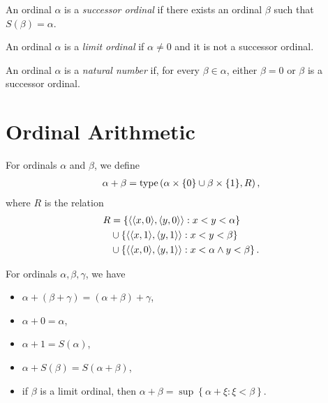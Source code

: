 \begin{defn}
    An ordinal $\alpha$ is a \emph{successor ordinal} if there exists an ordinal $\beta$ such that $S(\beta) = \alpha$.

    An ordinal $\alpha$ is a \emph{limit ordinal} if $\alpha \neq 0$ and it is not a successor ordinal.

    An ordinal $\alpha$ is a \emph{natural number} if, for every $\beta \in \alpha$, either $\beta = 0$ or $\beta$ is a successor ordinal.
\end{defn}

\section{Ordinal Arithmetic}

\begin{defn}
    For ordinals $\alpha$ and $\beta$, we define
    \begin{align*}
        \alpha + \beta = \operatorname{type}\left(\alpha \times \{0\} \cup \beta \times \{1\}, R\right),
    \end{align*}
    where $R$ is the relation
    \begin{align*}
        R &= \left\{\langle \langle x, 0 \rangle, \langle y, 0 \rangle \rangle : x < y < \alpha\right\} \\
        &\cup \left\{\langle \langle x, 1 \rangle, \langle y, 1 \rangle \rangle : x < y < \beta\right\} \\
        &\cup \left\{\langle \langle x, 0 \rangle, \langle y, 1 \rangle \rangle : x < \alpha \land y < \beta\right\}.
    \end{align*}
\end{defn}

\begin{thm}
    For ordinals $\alpha, \beta, \gamma$, we have
    \begin{itemize}
        \item $\alpha + (\beta + \gamma) = (\alpha + \beta) + \gamma$,
        \item $\alpha + 0 = \alpha$,
        \item $\alpha + 1 = S(\alpha)$,
        \item $\alpha + S(\beta) = S(\alpha + \beta)$,
        \item if $\beta$ is a limit ordinal, then $\alpha + \beta = \sup\left\{\alpha + \xi : \xi < \beta\right\}$.
    \end{itemize}
\end{thm}

